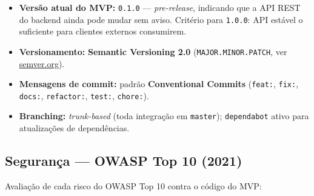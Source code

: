 \documentclass[11pt, a4paper]{article}
\begin{document}
\begin{itemize}
  \item \textbf{Versão atual do MVP:} \texttt{0.1.0} --- \textit{pre-release}, indicando que a API REST do backend ainda pode mudar sem aviso. Critério para \texttt{1.0.0}: API estável o suficiente para clientes externos consumirem.
  \item \textbf{Versionamento:} \textbf{Semantic Versioning 2.0} (\texttt{MAJOR.MINOR.PATCH}, ver \href{https://semver.org/lang/pt-BR/}{semver.org}).
  \item \textbf{Mensagens de commit:} padrão \textbf{Conventional Commits} (\texttt{feat:}, \texttt{fix:}, \texttt{docs:}, \texttt{refactor:}, \texttt{test:}, \texttt{chore:}).
  \item \textbf{Branching:} \textit{trunk-based} (toda integração em \texttt{master}); \texttt{dependabot} ativo para atualizações de dependências.
\end{itemize}

\subsection{Segurança --- OWASP Top 10 (2021)}

Avaliação de cada risco do OWASP Top 10 contra o código do MVP:
\end{document}
